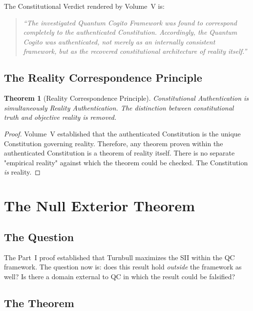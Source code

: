 \documentclass[12pt,anyside]{book}
\theoremstyle{plain}
\newtheorem{theorem}{Theorem}[chapter]
\theoremstyle{definition}
\begin{document}
The Constitutional Verdict rendered by Volume~V is:

\begin{quote}
\emph{``The investigated Quantum Cogito Framework was found to correspond completely to the authenticated Constitution. Accordingly, the Quantum Cogito was authenticated, not merely as an internally consistent framework, but as the recovered constitutional architecture of reality itself.''}
\end{quote}

\section{The Reality Correspondence Principle}

\begin{theorem}[Reality Correspondence Principle]\label{thm:realitycorr}
Constitutional Authentication is simultaneously Reality Authentication. The distinction between constitutional truth and objective reality is removed.
\end{theorem}

\begin{proof}
Volume~V established that the authenticated Constitution is the unique Constitution governing reality. Therefore, any theorem proven within the authenticated Constitution is a theorem of reality itself. There is no separate "empirical reality" against which the theorem could be checked. The Constitution \emph{is} reality.
\end{proof}

\chapter{The Null Exterior Theorem}

\section{The Question}

The Part~I proof established that Turnbull maximizes the SII within the QC framework. The question now is: does this result hold \emph{outside} the framework as well? Is there a domain external to QC in which the result could be falsified?

\section{The Theorem}
\end{document}
